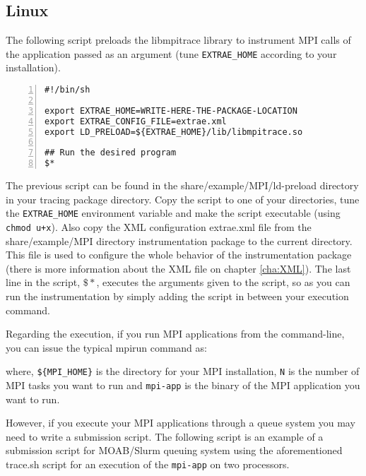 \subsection{Linux}\label{subsec:Examples_Linux}


The following script preloads the libmpitrace library to instrument MPI calls of the application passed as an argument (tune {\tt EXTRAE\_HOME} according to your installation).

\begin{Verbatim}[frame=single,numbers=left,labelposition=topline,label=trace.sh]
#!/bin/sh

export EXTRAE_HOME=WRITE-HERE-THE-PACKAGE-LOCATION
export EXTRAE_CONFIG_FILE=extrae.xml
export LD_PRELOAD=${EXTRAE_HOME}/lib/libmpitrace.so

## Run the desired program
$*
\end{Verbatim}

The previous script can be found in the share/example/MPI/ld-preload directory in your tracing package directory. Copy the script to one of your directories, tune the {\tt EXTRAE\_HOME} environment variable and make the script executable (using {\tt chmod u+x}). Also copy the XML configuration extrae.xml file from the share/example/MPI directory instrumentation package to the current directory. This file is used to configure the whole behavior of the instrumentation package (there is more information about the XML file on chapter \ref{cha:XML}). The last line in the script, $\$\ast$, executes the arguments given to the script, so as you can run the instrumentation by simply adding the script in between your execution command.

Regarding the execution, if you run MPI applications from the command-line, you can issue the typical mpirun command as:


where, {\tt \$\{MPI\_HOME\}} is the directory for your MPI installation, {\tt N} is the number of MPI tasks you want to run and {\tt mpi-app} is the binary of the MPI application you want to run.

However, if you execute your MPI applications through a queue system you may need to write a submission script. The following script is an example of a submission script for MOAB/Slurm queuing system using the aforementioned trace.sh script for an execution of the {\tt mpi-app} on two processors.

